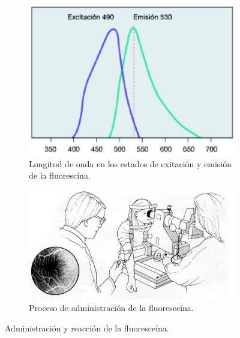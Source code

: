 \begin{figure}[H]
  \centering
	\begin{subfigure}[b]{0.45\textwidth}
        \includegraphics[width=1\textwidth]{./Figures/wavechanges.pdf}
        \caption{Longitud de onda en los estados de exitaci\'on y emisi\'on de la fluoresc\'ina.}
        \label{fig:wavechanges1}
    \end{subfigure}
	\begin{subfigure}[b]{0.45\textwidth}
        \includegraphics[width=1\textwidth]{./Figures/fluores.jpg}
        \caption{Proceso de administraci\'on de la fluoresce\'ina.}
        \label{fig:af2}
    \end{subfigure}
    \caption{Administraci\'on y reacci\'on de la fluoresce\'ina.}
\end{figure}



